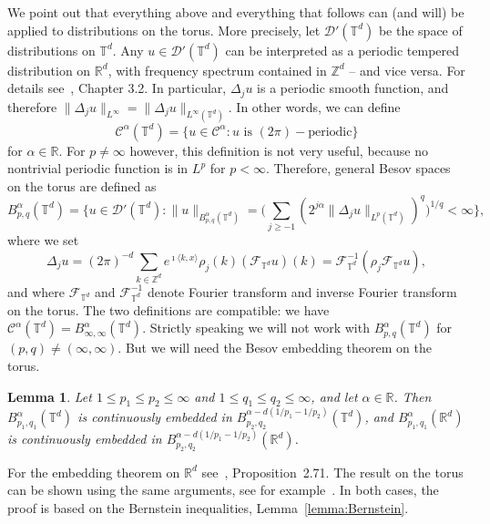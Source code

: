 \documentclass[11pt,a4paper]{article}
\newtheorem{lemma}[theorem]{Lemma}
\theoremstyle{remark}
\newcommand{\R}{\mathbb{R}}
\newcommand{\Z}{\mathbb{Z}}
\newcommand{\CC}{\ensuremath{\mathscr{C}}}
\newcommand{\CD}{\ensuremath{\mathscr{D}}}
\newcommand{\CF}{\ensuremath{\mathscr{F}}}
\begin{document}
We point out that everything above and everything that follows can (and will) be applied to distributions on the torus. More precisely, let $\CD'(\mathbb{T}^{d} )$ be the space of distributions on $\mathbb{T}^{d}$. Any $u \in \CD' (\mathbb{T}^{d} )$ can be interpreted as a periodic tempered distribution on $\mathbb{R}^{d}$, with frequency spectrum contained in $\mathbb{Z}^{d}$ -- and vice versa. For details see~\cite{Schmeisser1987}, Chapter 3.2. In particular, $\Delta_{j} u$ is a periodic smooth function, and therefore $\| \Delta_{j} u\|_{L^{\infty}} = \| \Delta_{j} u\|_{L^{\infty} (\mathbb{T}^{d} )}$. In other words, we can define
\[
    \CC^\alpha(\mathbb{T}^d) = \{ u \in \CC^\alpha: u \text{ is } (2\pi)-\text{periodic}\}
\]
for $\alpha \in \R$. For $p \neq \infty$ however, this definition is not very useful, because no nontrivial periodic function is in $L^p$ for $p < \infty$. Therefore, general Besov spaces on the torus are defined as%
\[
   B^\alpha_{p,q}(\mathbb{T}^d) = \biggl\{ u \in \mathcal{D}' (\mathbb{T}^d) : \lVert u\rVert_{B^{\alpha}_{p, q}(\mathbb{T}^d)} = \biggl( \sum_{j \geqslant - 1} (2^{j \alpha} \lVert \Delta_j u \rVert_{L^p(\mathbb{T}^d)})^q\biggr)^{1/q} < \infty \biggr\},
\]
where we set
\[
   \Delta_j u =  (2\pi)^{-d} \sum_{k \in \Z^d} e^{\imath \langle k, x\rangle} \rho_j(k) (\CF_{\mathbb{T}^d}{u})(k) = \CF_{\mathbb{T}^d}^{-1} (\rho_j \CF_{\mathbb{T}^d}{u}),
\]
and where $\CF_{\mathbb{T}^d}$ and $\CF_{\mathbb{T}^d}^{-1}$ denote Fourier transform and inverse Fourier transform on the torus. The two definitions are compatible: we have $\CC^\alpha(\mathbb{T}^d) = B^\alpha_{\infty, \infty}(\mathbb{T}^d)$. 
Strictly speaking we will not work with $B^\alpha_{p,q}(\mathbb{T}^d)$ for $(p,q) \neq (\infty, \infty)$. But we will need the Besov embedding theorem on the torus.
\begin{lemma}\label{l:besov embedding torus}
   Let $1\leqslant p_1 \leqslant p_2 \leqslant \infty$ and $1\leqslant q_1 \leqslant q_2 \leqslant \infty$, and let $\alpha \in \R$. Then $B^{\alpha}_{p_1,q_1}(\mathbb{T}^d)$ is continuously embedded in $B^{\alpha - d(1/p_1 - 1/p_2)}_{p_2,q_2}(\mathbb{T}^d)$, and $B^{\alpha}_{p_1,q_1}(\mathbb{R}^d)$ is continuously embedded in $B^{\alpha - d(1/p_1 - 1/p_2)}_{p_2,q_2}(\mathbb{R}^d)$.
\end{lemma}
For the embedding theorem on $\R^d$ see~\cite{Bahouri2011}, Proposition~2.71. The result on the torus can be shown using the same arguments, see for example~\cite{Chemin2006}. In both cases, the proof is based on the Bernstein inequalities, Lemma~\ref{lemma:Bernstein}.
\end{document}
